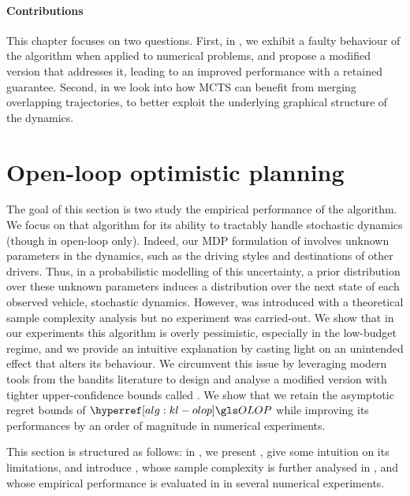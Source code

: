 \paragraph{Contributions} This chapter focuses on two questions. First, in , we exhibit a faulty behaviour of the \OLOP algorithm when applied to numerical problems, and propose a modified version that addresses it, leading to an improved performance with a retained guarantee. Second, in  we look into how \gls{MCTS} can benefit from merging overlapping trajectories, to better exploit the underlying graphical structure of the dynamics.

\section{Open-loop optimistic planning}
\label{sec:olop}

The goal of this section is two study the empirical performance of the \OLOP algorithm. We focus on that algorithm for its ability to tractably handle stochastic dynamics (though in open-loop only). Indeed, our \gls{MDP} formulation of  involves unknown parameters in the dynamics, such as the driving styles and destinations of other drivers. Thus, in a probabilistic modelling of this uncertainty, a prior distribution over these unknown parameters induces a distribution over the next state of each observed vehicle, \ie stochastic dynamics. However, \OLOP was introduced with a theoretical sample complexity analysis but no experiment was carried-out. We show that in our experiments this algorithm is overly pessimistic, especially in the low-budget regime, and we provide an intuitive explanation by casting light on an unintended effect that alters its behaviour. We circumvent this issue by leveraging modern tools from the bandits literature to design and analyse a modified version with tighter upper-confidence bounds called \KLOLOP. We show that we retain the asymptotic regret bounds of $\OLOP$ while improving its performances by an order of magnitude in numerical experiments.

This section is structured as follows: in , we present \OLOP, give some intuition on its limitations, and introduce \KLOLOP, whose sample complexity is further analysed in , and whose empirical performance is evaluated in  in several numerical experiments.

